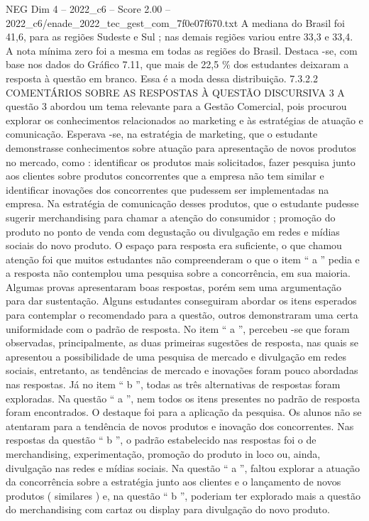 \begin{textsample}{NEG Dim 4 – 2022\_c6 – Score 2.00 – 2022\_c6/enade\_2022\_tec\_gest\_com\_7f0e07f670.txt}
A mediana do Brasil foi 41,6, para as regiões Sudeste e Sul ; nas demais regiões variou entre 33,3 e 33,4.
A nota mínima zero foi a mesma em todas as regiões do Brasil.
Destaca -se, com base nos dados do Gráfico 7.11, que mais de 22,5 \% dos estudantes deixaram a resposta à questão em branco.
Essa é a moda dessa distribuição. 7.3.2.2 COMENTÁRIOS SOBRE AS RESPOSTAS À QUESTÃO DISCURSIVA 3 A questão 3 abordou um tema relevante para a Gestão Comercial, pois procurou explorar os conhecimentos relacionados ao marketing e às estratégias de atuação e comunicação.
Esperava -se, na estratégia de marketing, que o estudante demonstrasse conhecimentos sobre atuação para apresentação de novos produtos no mercado, como : identificar os produtos mais solicitados, fazer pesquisa junto aos clientes sobre produtos concorrentes que a empresa não tem similar e identificar inovações dos concorrentes que pudessem ser implementadas na empresa.
Na estratégia de comunicação desses produtos, que o estudante pudesse sugerir merchandising para chamar a atenção do consumidor ; promoção do produto no ponto de venda com degustação ou divulgação em redes e mídias sociais do novo produto.
O espaço para resposta era suficiente, o que chamou atenção foi que muitos estudantes não compreenderam o que o item “ a ” pedia e a resposta não contemplou uma pesquisa sobre a concorrência, em sua maioria.
Algumas provas apresentaram boas respostas, porém sem uma argumentação para dar sustentação.
Alguns estudantes conseguiram abordar os itens esperados para contemplar o recomendado para a questão, outros demonstraram uma certa uniformidade com o padrão de resposta.
No item “ a ”, percebeu -se que foram observadas, principalmente, as duas primeiras sugestões de resposta, nas quais se apresentou a possibilidade de uma pesquisa de mercado e divulgação em redes sociais, entretanto, as tendências de mercado e inovações foram pouco abordadas nas respostas.
Já no item “ b ”, todas as três alternativas de respostas foram exploradas.
Na questão “ a ”, nem todos os itens presentes no padrão de resposta foram encontrados.
O destaque foi para a aplicação da pesquisa.
Os alunos não se atentaram para a tendência de novos produtos e inovação dos concorrentes.
Nas respostas da questão “ b ”, o padrão estabelecido nas respostas foi o de merchandising, experimentação, promoção do produto in loco ou, ainda, divulgação nas redes e mídias sociais.
Na questão “ a ”, faltou explorar a atuação da concorrência sobre a estratégia junto aos clientes e o lançamento de novos produtos ( similares ) e, na questão “ b ”, poderiam ter explorado mais a questão do merchandising com cartaz ou display para divulgação do novo produto.

\end{textsample}
